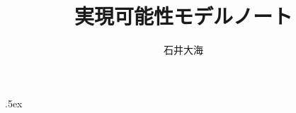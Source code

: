 \theoremstyle{nonumberplain}
\theoremprework{\begin{mystdthmbox}{}}
\theorempostwork{\end{mystdthmbox}}
\newtheorem{rem*}{注意}
\theoremprework{\begin{mystdthmbox}{}}
\theorempostwork{\end{mystdthmbox}}
\newtheorem{notation}{記号}
\theoremstyle{nonumberplain}
\theoremheaderfont{\itshape}
\theoremindent .5ex
\theorembodyfont{\upshape}
\theoremsymbol{\ensuremath{\Box}}
\theoremprework{\begin{mythmleftbar}}
\theorempostwork{\end{mythmleftbar}}
\theoremseparator{}
\newtheorem{subproof}{Proof}

\qedsymbol{\ensuremath{\Box}}
\normalem


\makeatletter
\def\KVM#1{\KVM@init#1{\relax}}
\def\KVM@init#1#2{#1 \cons \KVM@rest#2}
\def\KVM@rest#1#2{%
\def\KVM@next{\KVM@rest{#1 \push #2}}
\ifx#2\relax
#1
\else
\expandafter\KVM@next
\fi
}
\makeatother
\renewcommand{\emph}[1]{\textsf{\textgt{#1}}}

\title{実現可能性モデルノート}
\author{石井大海}

\usepackage{amssymb}	%
\usepackage{amsmath}	%
\usepackage[normalem]{ulem}	%

